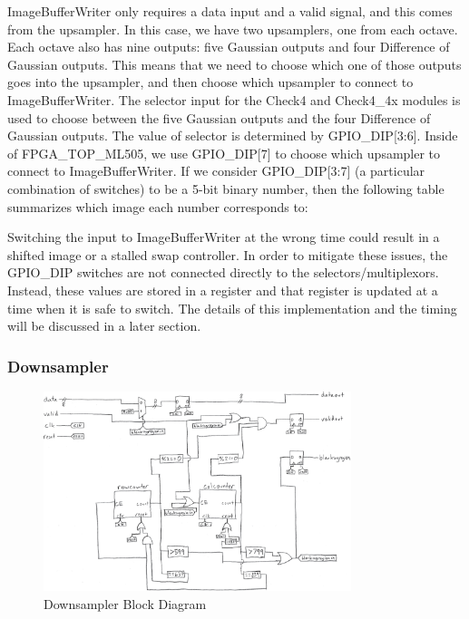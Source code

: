 ImageBufferWriter only requires a data input and a valid signal, and this comes 
from the upsampler. In this case, we have two upsamplers, one from each octave. 
Each octave also has nine outputs: five Gaussian outputs and four Difference of 
Gaussian outputs. This means that we need to choose which one of those outputs 
goes into the upsampler, and then choose which upsampler to connect to 
ImageBufferWriter. The selector input for the Check4 and Check4\_4x modules is 
used to choose between the five Gaussian outputs and the four Difference of 
Gaussian outputs. The value of selector is determined by GPIO\_DIP[3:6]. Inside 
of FPGA\_TOP\_ML505, we use GPIO\_DIP[7] to choose which upsampler to connect to 
ImageBufferWriter. If we consider GPIO\_DIP[3:7] (a particular combination of 
switches) to be a 5-bit binary number, then the following table summarizes which 
image each number corresponds to:


Switching the input to ImageBufferWriter at the wrong time could result in 
a shifted image or a stalled swap controller. In order to mitigate these issues, 
the GPIO\_DIP switches are not connected directly to the selectors/multiplexors. 
Instead, these values are stored in a register and that register is updated at 
a time when it is safe to switch. The details of this implementation and the 
timing will be discussed in a later section.


\subsubsection{Downsampler}

\begin{figure}
    \centering
    \includegraphics[width=0.8\textwidth]{processed_image_pngs/Downsampler.png}
    \caption{Downsampler Block Diagram}
    \label{fig:downsampler}
\end{figure}


